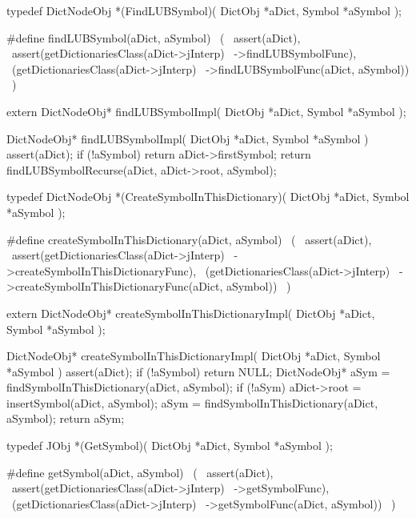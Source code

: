 \startTestSuite[findLUBSymbol]
\startCHeader
typedef DictNodeObj *(FindLUBSymbol)(
  DictObj *aDict,
  Symbol  *aSymbol
);

#define findLUBSymbol(aDict, aSymbol)           \
  (                                             \
    assert(aDict),                              \
    assert(getDictionariesClass(aDict->jInterp) \
      ->findLUBSymbolFunc),                     \
    (getDictionariesClass(aDict->jInterp)       \
      ->findLUBSymbolFunc(aDict, aSymbol))      \
  )
\stopCHeader

\setCHeaderStream{private}
\startCHeader
extern DictNodeObj* findLUBSymbolImpl(
  DictObj *aDict,
  Symbol  *aSymbol
);
\stopCHeader
\setCHeaderStream{public}

\startCCode
DictNodeObj* findLUBSymbolImpl(
  DictObj *aDict,
  Symbol  *aSymbol
) {
  assert(aDict);
  if (!aSymbol) return aDict->firstSymbol;
  return findLUBSymbolRecurse(aDict, aDict->root, aSymbol);
}
\stopCCode
\stopTestSuite

\startTestSuite[createSymbol]

\startCHeader
typedef DictNodeObj *(CreateSymbolInThisDictionary)(
  DictObj *aDict,
  Symbol  *aSymbol
);

#define createSymbolInThisDictionary(aDict, aSymbol)      \
        (                                                 \
    assert(aDict),                                        \
    assert(getDictionariesClass(aDict->jInterp)           \
      ->createSymbolInThisDictionaryFunc),                \
    (getDictionariesClass(aDict->jInterp)                 \
      ->createSymbolInThisDictionaryFunc(aDict, aSymbol)) \
  )
\stopCHeader

\startCHeader
extern DictNodeObj* createSymbolInThisDictionaryImpl(
  DictObj *aDict,
  Symbol  *aSymbol
);
\stopCHeader
\setCHeaderStream{public}

\startCCode
DictNodeObj* createSymbolInThisDictionaryImpl(
  DictObj *aDict,
  Symbol  *aSymbol
) {
  assert(aDict);
  if (!aSymbol) return NULL;
  DictNodeObj* aSym =
    findSymbolInThisDictionary(aDict, aSymbol);
  if (!aSym) {
    aDict->root = insertSymbol(aDict, aSymbol);
    aSym = findSymbolInThisDictionary(aDict, aSymbol);
  }
  return aSym;
}
\stopCCode
\stopTestSuite

\startTestSuite[getSymbol]

\startCHeader
typedef JObj *(GetSymbol)(
  DictObj *aDict,
  Symbol  *aSymbol
);

#define getSymbol(aDict, aSymbol)               \
  (                                             \
    assert(aDict),                              \
    assert(getDictionariesClass(aDict->jInterp) \
      ->getSymbolFunc),                         \
    (getDictionariesClass(aDict->jInterp)       \
      ->getSymbolFunc(aDict, aSymbol))          \
  )
\stopCHeader

